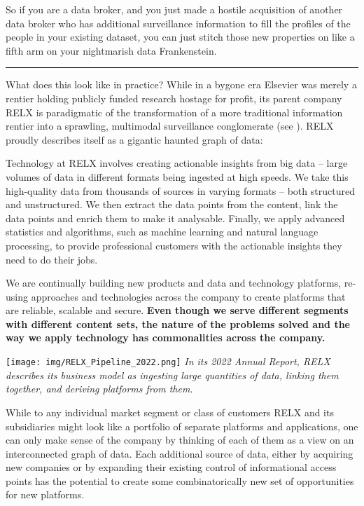 So if you are a data broker, and you just made a hostile acquisition of
another data broker who has additional surveillance information to fill
the profiles of the people in your existing dataset, you can just stitch
those new properties on like a fifth arm on your nightmarish data
Frankenstein.

\begin{center}\rule{0.5\linewidth}{0.5pt}\end{center}

What does this look like in practice? While in a bygone era Elsevier was
merely a rentier holding publicly funded research hostage for profit,
its parent company RELX is paradigmatic of the transformation of a more
traditional information rentier into a sprawling, multimodal
surveillance conglomerate (see \cite{lamdanDataCartelsCompanies2023} ). RELX proudly describes itself as a gigantic haunted graph of
data:

\begin{leftbar}
Technology at RELX involves creating actionable insights from big data
-- large volumes of data in different formats being ingested at high
speeds. We take this high-quality data from thousands of sources in
varying formats -- both structured and unstructured. We then extract the
data points from the content, link the data points and enrich them to
make it analysable. Finally, we apply advanced statistics and
algorithms, such as machine learning and natural language processing, to
provide professional customers with the actionable insights they need to
do their jobs.

We are continually building new products and data and technology
platforms, re-using approaches and technologies across the company to
create platforms that are reliable, scalable and secure. \textbf{Even
though we serve different segments with different content sets, the
nature of the problems solved and the way we apply technology has
commonalities across the company.} \cite{relxAnnualReport20222023} 
\end{leftbar}

\texttt{[image: img/RELX\_Pipeline\_2022.png]}
\emph{In its 2022 Annual Report, RELX describes its business model as
ingesting large quantities of data, linking them together, and deriving
platforms from them. \cite{relxAnnualReport20222023} }

While to any individual market segment or class of customers RELX and
its subsidiaries might look like a portfolio of separate platforms and
applications, one can only make sense of the company by thinking of each
of them as a view on an interconnected graph of data. Each additional source of data, either by acquiring new
companies or by expanding their existing control of informational access
points has the potential to create some combinatorically new set of
opportunities for new platforms.

